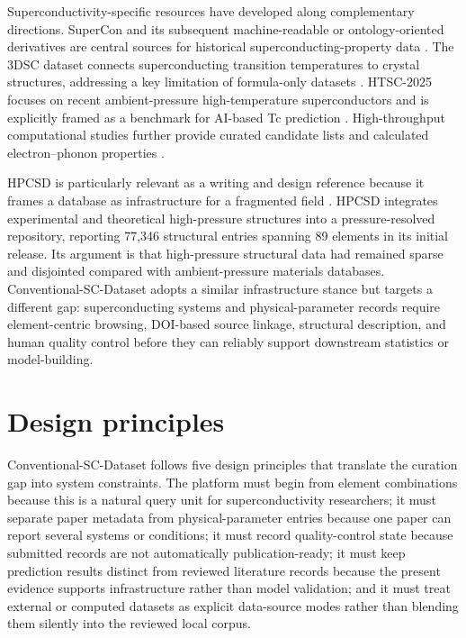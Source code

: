 \documentclass[11pt,a4paper]{article}
\begin{document}
Superconductivity-specific resources have developed along complementary directions. SuperCon and its subsequent machine-readable or ontology-oriented derivatives are central sources for historical superconducting-property data \cite{nimsSupercon,foppiano2023supercon2,ishii2023ontology}. The 3DSC dataset connects superconducting transition temperatures to crystal structures, addressing a key limitation of formula-only datasets \cite{sommer2023threedsc}. HTSC-2025 focuses on recent ambient-pressure high-temperature superconductors and is explicitly framed as a benchmark for AI-based Tc prediction \cite{han2025htsc}. High-throughput computational studies further provide curated candidate lists and calculated electron--phonon properties \cite{bercx2025prxenergy,pires2026ambient}.

HPCSD is particularly relevant as a writing and design reference because it frames a database as infrastructure for a fragmented field \cite{wang2026hpcsd}. HPCSD integrates experimental and theoretical high-pressure structures into a pressure-resolved repository, reporting 77,346 structural entries spanning 89 elements in its initial release. Its argument is that high-pressure structural data had remained sparse and disjointed compared with ambient-pressure materials databases. Conventional-SC-Dataset adopts a similar infrastructure stance but targets a different gap: superconducting systems and physical-parameter records require element-centric browsing, DOI-based source linkage, structural description, and human quality control before they can reliably support downstream statistics or model-building.

\section{Design principles}

Conventional-SC-Dataset follows five design principles that translate the curation gap into system constraints. The platform must begin from element combinations because this is a natural query unit for superconductivity researchers; it must separate paper metadata from physical-parameter entries because one paper can report several systems or conditions; it must record quality-control state because submitted records are not automatically publication-ready; it must keep prediction results distinct from reviewed literature records because the present evidence supports infrastructure rather than model validation; and it must treat external or computed datasets as explicit data-source modes rather than blending them silently into the reviewed local corpus.
\end{document}
